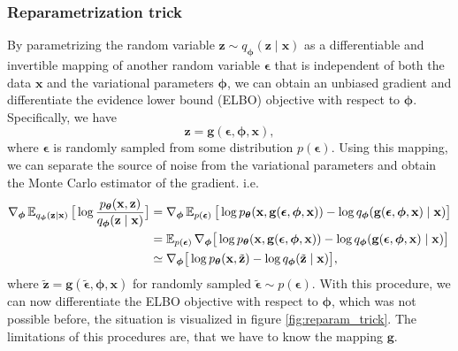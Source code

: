 \subsubsection{Reparametrization trick}
By parametrizing the random variable $\mathbf{z} \sim q_{\boldsymbol{\phi}}(\mathbf{z}\mid \mathbf{x})$ as a differentiable and invertible mapping of another random variable $\boldsymbol{\epsilon}$ that is independent
of both the data $\mathbf{x}$ and the variational parameters ${\boldsymbol{\phi}}$, we can obtain an unbiased gradient and differentiate the evidence lower bound (ELBO) objective with respect to ${\boldsymbol{\phi}}$. 
Specifically, we have 
\begin{equation*}
    \mathbf{z} = \mathbf{g}(\boldsymbol{\epsilon},{\boldsymbol{\phi}},\mathbf{x}),
\end{equation*}
where $\boldsymbol{\epsilon}$ is randomly sampled from some distribution $p(\boldsymbol{\epsilon})$. Using this mapping, we can separate the source of noise from the variational parameters and 
obtain the Monte Carlo estimator of the gradient. i.e.
\begin{align*}
    \nabla_{{\boldsymbol{\phi}}} \operatorname{\mathbb{E}}_{q_{\boldsymbol{\phi}}(\mathbf{z}\mid \mathbf{x})} \big[\log \frac{p_{\boldsymbol{\theta}}(\mathbf{x},\mathbf{z})}{q_{\boldsymbol{\phi}}(\mathbf{z}\mid \mathbf{x})}\big] 
    &= \nabla_{{\boldsymbol{\phi}}} \operatorname{\mathbb{E}}_{p(\boldsymbol{\epsilon})} \big[\log p_{\boldsymbol{\theta}}(\mathbf{x},\mathbf{g}(\boldsymbol{\epsilon},{\boldsymbol{\phi}},\mathbf{x})) - \log q_{\boldsymbol{\phi}}(\mathbf{g}(\boldsymbol{\epsilon},{\boldsymbol{\phi}},\mathbf{x})\mid \mathbf{x})\big]\\
    &=  \operatorname{\mathbb{E}}_{p(\boldsymbol{\epsilon})} \nabla_{{\boldsymbol{\phi}}} \big[\log p_{\boldsymbol{\theta}}(\mathbf{x},\mathbf{g}(\boldsymbol{\epsilon},{\boldsymbol{\phi}},\mathbf{x})) - \log q_{\boldsymbol{\phi}}(\mathbf{g}(\boldsymbol{\epsilon},{\boldsymbol{\phi}},\mathbf{x})\mid \mathbf{x})\big] \\
    &\simeq \nabla_{{\boldsymbol{\phi}}} \big[\log p_{\boldsymbol{\theta}}(\mathbf{x},\tilde{\mathbf{z}}) - \log q_{\boldsymbol{\phi}}(\tilde{\mathbf{z}}\mid \mathbf{x})\big],
\end{align*}
where $\tilde{\mathbf{z}} = \mathbf{g}(\tilde{\boldsymbol{\epsilon}},{\boldsymbol{\phi}},\mathbf{x})$  for randomly sampled $\tilde{\boldsymbol{\epsilon}} \sim p(\boldsymbol{\epsilon})$. 
With this procedure, we can now differentiate the ELBO objective with respect to ${\boldsymbol{\phi}}$, which was not possible before, the situation is visualized in figure \ref{fig:reparam_trick}. The limitations of this procedures are, that we have to know the mapping $\mathbf{g}$.
